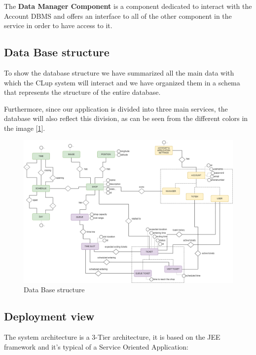 The \textbf{Data Manager Component} is a component dedicated to interact with the Account DBMS and offers an interface to all of the other component in the service in order to have access to it. 

\subsection{Data Base structure}
\label{subsect:databasestructure}

To show the database structure we have summarized all the main data with which the CLup system will interact and we have organized them in a schema that represents the structure of the entire database.

Furthermore, since our application is divided into three main services, the database will also reflect this division, as can be seen from the different colors in the image [\ref{fig:database}].

\begin{figure}[h!]
    \centering
    \includegraphics[width=\textwidth]{Images/entityrelationhipCLUP.png}
    \caption{\label{fig:database}{Data Base structure}}
\end{figure}

\FloatBarrier

\subsection{Deployment view}
\label{subsect:deploymentview}

The system architecture is a 3-Tier architecture, it is based on the JEE framework and it's typical of a Service Oriented Application:

